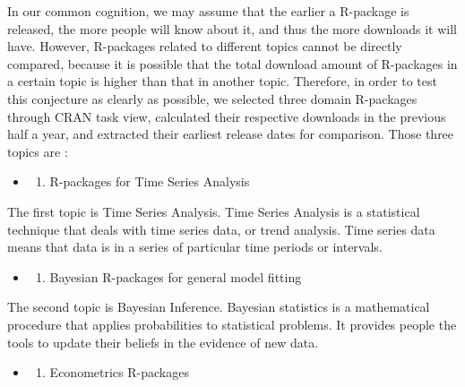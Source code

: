 \documentclass[
]{book}
\providecommand{\tightlist}{%
  \setlength{\itemsep}{0pt}\setlength{\parskip}{0pt}}
\begin{document}
In our common cognition, we may assume that the earlier a R-package is released, the more people will know about it, and thus the more downloads it will have. However, R-packages related to different topics cannot be directly compared, because it is possible that the total download amount of R-packages in a certain topic is higher than that in another topic. Therefore, in order to test this conjecture as clearly as possible, we selected three domain R-packages through CRAN task view\autocite{crantaskviews}, calculated their respective downloads in the previous half a year, and extracted their earliest release dates for comparison. Those three topics are :

\begin{itemize}
\item
  \begin{enumerate}
  \def\labelenumi{\alph{enumi})}
  \tightlist
  \item
    R-packages for Time Series Analysis
  \end{enumerate}
\end{itemize}

The first topic is Time Series Analysis. Time Series Analysis is a statistical technique that deals with time series data, or trend analysis. Time series data means that data is in a series of particular time periods or intervals\autocite{timeseries}.

\begin{itemize}
\item
  \begin{enumerate}
  \def\labelenumi{\alph{enumi})}
  \setcounter{enumi}{1}
  \tightlist
  \item
    Bayesian R-packages for general model fitting
  \end{enumerate}
\end{itemize}

The second topic is Bayesian Inference. Bayesian statistics is a mathematical procedure that applies probabilities to statistical problems. It provides people the tools to update their beliefs in the evidence of new data\autocite{bayesian}.

\begin{itemize}
\item
  \begin{enumerate}
  \def\labelenumi{\alph{enumi})}
  \setcounter{enumi}{2}
  \tightlist
  \item
    Econometrics R-packages
  \end{enumerate}
\end{itemize}
\end{document}
